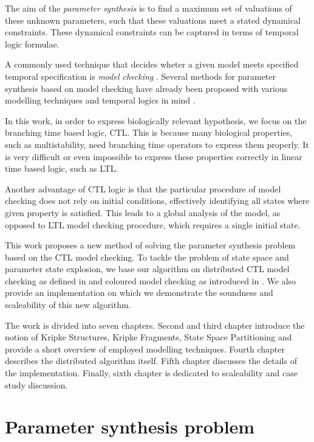 \documentclass[12pt,oneside, draft]{fithesis2}
\begin{document}
		The aim of the \emph{parameter synthesis} is to find a maximum set of valuations of these unknown parameters, such that these valuations meet a stated dynamical constraints. These dynamical constraints can be captured in terms of temporal logic formulae. 
				
		A commonly used technique that decides wheter a given model meets specified temporal specification is \emph{model checking} \cite{clarke}. Several methods for parameter synthesis based on model checking have already been proposed with various modelling techniques and temporal logics in mind \cite{ieee,batt,gilbert,donze,jha}.
		
		In this work, in order to express biologically relevant hypothesis, we focus on the branching time based logic, CTL. This is because many biological properties, such as multistability, need branching time operators to express them properly. It is very difficult or even impossible to express these properties correctly in linear time based logic, such as LTL. 
		
		Another advantage of CTL logic is that the particular procedure of model checking does not rely on initial conditions, effectively identifying all states where given property is satisfied. This leads to a global analysis of the model, as opposed to LTL model checking procedure, which requires a single initial state.
				
		This work proposes a new method of solving the parameter synthesis problem based on the CTL model checking. To tackle the problem of state space and parameter state explosion, we base our algorithm on distributed CTL model checking as defined in \cite{assumptions} and coloured model checking as introduced in \cite{ieee}. We also provide an implementation on which we demonstrate the soundness and scaleability of this new algorithm. 		
		
		The work is divided into seven chapters. Second and third chapter introduce the notion of Kripke Structures, Kripke Fragments, State Space Partitioning and provide a short overview of employed modelling techniques. Fourth chapter describes the distributed algorithm itself. Fifth chapter discusses the details of the implementation. Finally, sixth chapter is dedicated to scaleability and case study discussion.
				
	\chapter{Parameter synthesis problem}
		
\end{document}
